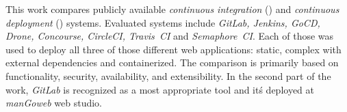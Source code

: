 This work compares publicly available \textit{continuous integration} (\CI) and \textit{continuous deployment} (\CD) systems. Evaluated systems include \textit{GitLab, Jenkins, GoCD, Drone, Concourse, CircleCI, Travis~CI} and \textit{Semaphore~CI}. Each of those was used to deploy all three of those different web applications: static, complex with external dependencies and containerized. The comparison is primarily based on functionality, security, availability, and extensibility. In the second part of the work, \textit{GitLab} is recognized as a most appropriate tool and it\'s deployed at \textit{manGoweb} web studio.

